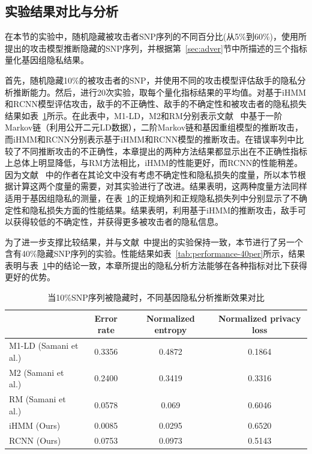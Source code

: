 \subsection{实验结果对比与分析}

在本节的实验中，随机隐藏被攻击者SNP序列的不同百分比(从5\%到60\%)，使用所提出的攻击模型推断隐藏的SNP序列，并根据第~\ref{sec:adver}节中所描述的三个指标量化基因组隐私结果。

首先，随机隐藏10\%的被攻击者的SNP，并使用不同的攻击模型评估敌手的隐私分析推断能力。然后，进行20次实验，取每个量化指标结果的平均值。对基于iHMM和RCNN模型评估攻击，敌手的不正确性、敌手的不确定性和被攻击者的隐私损失结果如表~\ref{tab:performance-10per}所示。在此表中，M1-LD，M2和RM分别表示文献~\cite{samani2015quantifying} 中基于一阶Markov链（利用公开二元LD数据），二阶Markov链和基因重组模型的推断攻击，而iHMM和RCNN分别表示基于iHMM和RCNN模型的推断攻击。在错误率列中比较了不同推断攻击的不正确性，本章提出的两种方法结果都显示出在不正确性指标上总体上明显降低，与RM方法相比，iHMM的性能更好，而RCNN的性能稍差。因为文献~\cite{samani2015quantifying} 中的作者在其论文中没有考虑不确定性和隐私损失的度量，所以本节根据计算这两个度量的需要，对其实验进行了改进。结果表明，这两种度量方法同样适用于基因组隐私的测量，在表~\ref{tab:performance-10per}的正规熵列和正规隐私损失列中分别显示了不确定性和隐私损失方面的性能结果。结果表明，利用基于iHMM的推断攻击，敌手可以获得较低的不确定性，并获得更多被攻击者的隐私信息。

为了进一步支撑比较结果，并与文献~\cite{samani2015quantifying}中提出的实验保持一致，本节进行了另一个含有40\%隐藏SNP序列的实验。性能结果如表~\ref{tab:performance-40per}所示，结果表明与表~\ref{tab:performance-10per}中的结论一致，本章所提出的隐私分析方法能够在各种指标对比下获得更好的优势。

\begin{table}[htbp]
	\caption{当10\%SNP序列被隐藏时，不同基因隐私分析推断效果对比}
	\label{tab:performance-10per}
	\begin{tabular}{lccc}
		\hline
		& Error rate & Normalized entropy & Normalized privacy loss\\
		\hline
		M1-LD (Samani et al.) & 0.3356  & 0.4872 & 0.1864 \\
		M2 (Samani et al.)    & 0.2400  & 0.3419 & 0.3316\\
		RM (Samani et al.)    &  0.0578 & 0.069 & 0.6046 \\
		iHMM (Ours)          & 0.0085  &0.0295 & 0.6520 \\
		RCNN (Ours)          & 0.0753  &0.0973 & 0.5143\\
		\hline
	\end{tabular}
\end{table}


